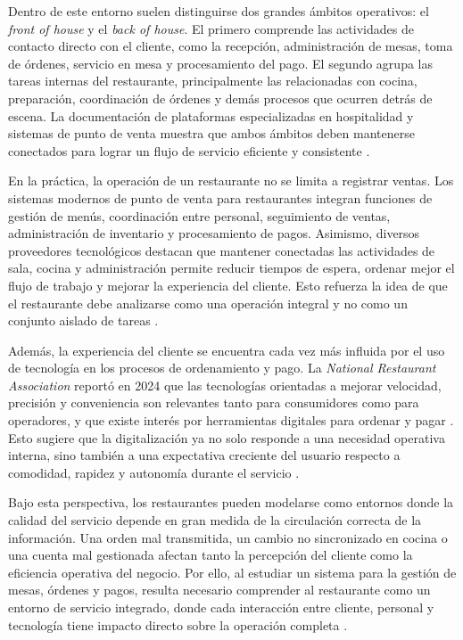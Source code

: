 \documentclass[12pt]{report}
\begin{document}
Dentro de este entorno suelen distinguirse dos grandes ámbitos operativos: el \textit{front of house} y el \textit{back of house}. El primero comprende las actividades de contacto directo con el cliente, como la recepción, administración de mesas, toma de órdenes, servicio en mesa y procesamiento del pago. El segundo agrupa las tareas internas del restaurante, principalmente las relacionadas con cocina, preparación, coordinación de órdenes y demás procesos que ocurren detrás de escena. La documentación de plataformas especializadas en hospitalidad y sistemas de punto de venta muestra que ambos ámbitos deben mantenerse conectados para lograr un flujo de servicio eficiente y consistente \cite{oracle_simphony_config,square_restaurant_pos_2025}.

En la práctica, la operación de un restaurante no se limita a registrar ventas. Los sistemas modernos de punto de venta para restaurantes integran funciones de gestión de menús, coordinación entre personal, seguimiento de ventas, administración de inventario y procesamiento de pagos. Asimismo, diversos proveedores tecnológicos destacan que mantener conectadas las actividades de sala, cocina y administración permite reducir tiempos de espera, ordenar mejor el flujo de trabajo y mejorar la experiencia del cliente. Esto refuerza la idea de que el restaurante debe analizarse como una operación integral y no como un conjunto aislado de tareas \cite{square_restaurant_pos_2025,lightspeed_restaurant_pos}.

Además, la experiencia del cliente se encuentra cada vez más influida por el uso de tecnología en los procesos de ordenamiento y pago. La \textit{National Restaurant Association} reportó en 2024 que las tecnologías orientadas a mejorar velocidad, precisión y conveniencia son relevantes tanto para consumidores como para operadores, y que existe interés por herramientas digitales para ordenar y pagar \cite{nra_tech_landscape_2024,nra_automated_ordering_payment_2024}. Esto sugiere que la digitalización ya no solo responde a una necesidad operativa interna, sino también a una expectativa creciente del usuario respecto a comodidad, rapidez y autonomía durante el servicio \cite{nra_tech_landscape_2024}.

Bajo esta perspectiva, los restaurantes pueden modelarse como entornos donde la calidad del servicio depende en gran medida de la circulación correcta de la información. Una orden mal transmitida, un cambio no sincronizado en cocina o una cuenta mal gestionada afectan tanto la percepción del cliente como la eficiencia operativa del negocio. Por ello, al estudiar un sistema para la gestión de mesas, órdenes y pagos, resulta necesario comprender al restaurante como un entorno de servicio integrado, donde cada interacción entre cliente, personal y tecnología tiene impacto directo sobre la operación completa \cite{square_restaurant_pos_2025,lightspeed_restaurant_pos}.
\end{document}
